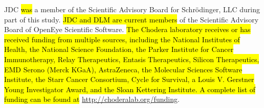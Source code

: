 \documentclass[9pt,lineno]{elife}
\begin{document}
JDC \hl{was} a member of the Scientific Advisory Board for Schr\"{o}dinger, LLC during part of this study.
\hl{JDC and DLM are current members} of the Scientific Advisory Board of OpenEye Scientific Software.
\hl{The Chodera laboratory receives or has received funding from multiple sources, including the National Institutes of Health, the National Science Foundation, the Parker Institute for Cancer Immunotherapy, Relay Therapeutics, Entasis Therapeutics, Silicon Therapeutics, EMD Serono (Merck KGaA), AstraZeneca, the Molecular Sciences Software Institute, the Starr Cancer Consortium, Cycle for Survival, a Louis V. Gerstner Young Investigator Award, and the Sloan Kettering Institute.
A complete list of funding can be found at} \url{http://choderalab.org/funding}.



\end{document}
